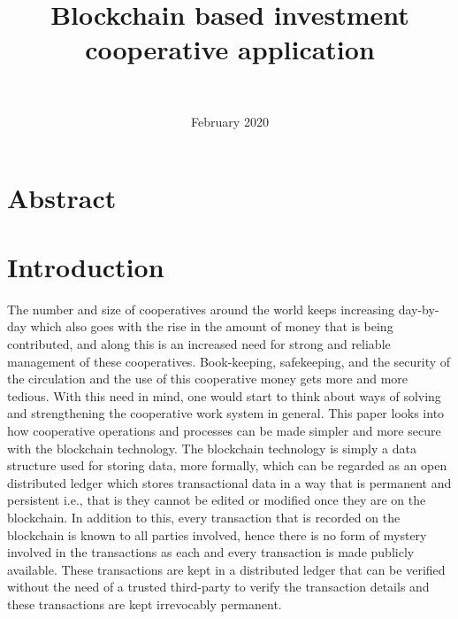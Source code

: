 \documentclass{article}
\begin{document}
\title{Blockchain based investment cooperative application}
\author{\\
}
\date{February 2020}

\maketitle

\begin{flushleft}
\section{Abstract}

\section{Introduction}
The number and size of cooperatives around the world keeps increasing day-by-day which also goes with the rise in the amount of money that is being contributed, and along this is an increased need for strong and reliable management of these cooperatives. Book-keeping, safekeeping, and the security of the circulation and the use of this cooperative money gets more and more tedious. With this need in mind, one would start to think about ways of solving and strengthening the cooperative work system in general. This paper looks into how cooperative operations and processes can be made simpler and more secure with the blockchain technology. The blockchain technology is simply a data structure used for storing data, more formally, which can be regarded as an open distributed ledger which stores transactional data in a way that is permanent and persistent i.e., that is they cannot be edited or modified once they are on the blockchain. In addition to this, every transaction that is recorded on the blockchain is known to all parties involved, hence there is no form of mystery involved in the transactions as each and every transaction is made publicly available. These transactions are kept in a distributed ledger that can be verified without the need of a trusted third-party to verify the transaction details and these transactions are kept irrevocably permanent. \cite{alma991019600567904436}


\end{flushleft}
\end{document}
